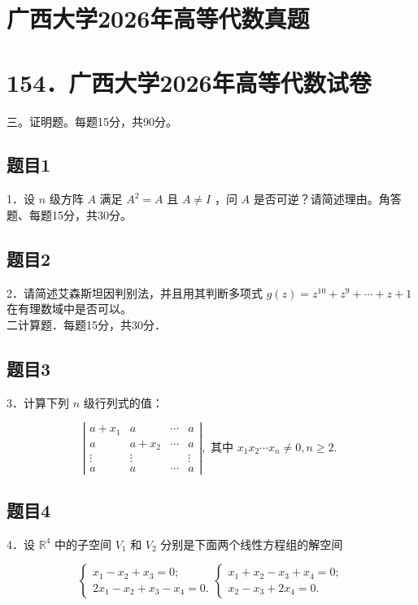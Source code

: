 \documentclass{article}
\begin{document}
\section*{广西大学2026年高等代数真题}
\section*{154．广西大学2026年高等代数试卷}
三。证明题。每题15分，共90分。\\

\subsection{题目1}
1．设 \(n\) 级方阵 \(A\) 满足 \(A^{2}=A\) 且 \(A \neq I\) ，问 \(A\) 是否可逆？请简述理由。角答题、每题15分，共30分。

\subsection{题目2}
2．请简述艾森斯坦因判别法，并且用其判断多项式 \(g(z)=z^{10}+z^{9}+\cdots+z+1\) 在有理数域中是否可以。\\
二计算题．每题15分，共30分．

\subsection{题目3}
3．计算下列 \(n\) 级行列式的值：

\[
\left|\begin{array}{cccc}
a+x_{1} & a & \cdots & a \\
a & a+x_{2} & \cdots & a \\
\vdots & \vdots & & \vdots \\
a & a & \cdots & a
\end{array}\right|, \text { 其中 } x_{1} x_{2} \cdots x_{n} \neq 0, n \geq 2 \text {. }
\]

\subsection{题目4}
4．设 \(\mathbb{R}^{4}\) 中的子空间 \(V_{1}\) 和 \(V_{2}\) 分别是下面两个线性方程组的解空间

\[
\left\{\begin{array} { l } 
{ x _ { 1 } - x _ { 2 } + x _ { 3 } = 0 ; } \\
{ 2 x _ { 1 } - x _ { 2 } + x _ { 3 } - x _ { 4 } = 0 . }
\end{array} \left\{\begin{array}{l}
x_{1}+x_{2}-x_{3}+x_{4}=0 ; \\
x_{2}-x_{3}+2 x_{4}=0 .
\end{array}\right.\right.
\]
\end{document}
